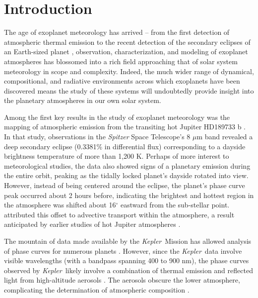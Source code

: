 \documentclass[manuscript]{aastex62}
\newcommand{\kepler}{{\it Kepler}}
\begin{document}





\section{Introduction}
\label{sec:Introduction}
The age of exoplanet meteorology has arrived -- from the first detection of atmospheric thermal emission \citep{2005Natur.434..740D, 2005ApJ...626..523C} to the recent detection of the secondary eclipses of an Earth-sized planet \citep{2016Natur.532..207D}, observation, characterization, and modeling of exoplanet atmospheres has blossomed into a rich field approaching that of solar system meteorology in scope and complexity. Indeed, the much wider range of dynamical, compositional, and radiative environments across which exoplanets have been discovered means the study of these systems will undoubtedly provide insight into the planetary atmospheres in our own solar system.

Among the first key results in the study of exoplanet meteorology was the mapping of atmospheric emission from the transiting hot Jupiter HD189733 b \citep{2007Natur.447..183K}. In that study, observations in the \emph{Spitzer} Space Telescope's 8 $\mu$m band revealed a deep secondary eclipse (0.3381\% in differential flux) corresponding to a dayside brightness temperature of more than 1,200 K. Perhaps of more interest to meteorological studies, the data also showed signs of a planetary emission during the entire orbit, peaking as the tidally locked planet's dayside rotated into view. However, instead of being centered around the eclipse, the planet's phase curve peak occurred about 2 hours before, indicating the brightest and hottest region in the atmosphere was shifted about 16$^\circ$ eastward from the sub-stellar point. \citet{2007Natur.447..183K} attributed this offset to advective transport within the atmosphere, a result anticipated by earlier studies of hot Jupiter atmospheres \citep[e.g.,][]{2002A&A...385..166S}. 

The mountain of data made available by the \kepler\ Mission has allowed analysis of phase curves for numerous planets \citep[e.g.,][]{2015ApJ...804..150E}. However, since the \kepler\ data involve visible wavelengths (with a bandpass spanning 400 to 900 nm), the phase curves observed by \kepler\ likely involve a combination of thermal emission and reflected light from high-altitude aerosols \citep{2000ApJ...538..885S}. The aerosols obscure the lower atmosphere, complicating the determination of atmospheric composition \citep{2016Natur.529...59S}. 
\end{document}
